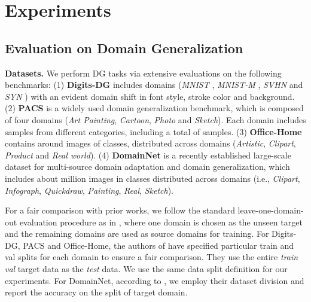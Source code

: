 \documentclass[10pt,twocolumn,letterpaper]{article}
\newcommand{\0}{{\bf 0}}
\begin{document}
\section{Experiments}

\subsection{Evaluation on Domain Generalization}
\textbf{Datasets.} We perform DG tasks via extensive evaluations on the following benchmarks: (1) \textbf{Digits-DG} \cite{zhou2020learning} includes  domains (\textit{MNIST} \cite{lecun1998gradient}, \textit{MNIST-M} \cite{ganin2015unsupervised}, \textit{SVHN} \cite{netzer2011reading} and \textit{SYN} \cite{ganin2015unsupervised}) with an evident domain shift in font style, stroke color and background. (2) \textbf{PACS} \cite{li2017deeper} is a widely used domain generalization benchmark, which is composed of four domains (\textit{Art Painting}, \textit{Cartoon}, \textit{Photo} and \textit{Sketch}). Each domain includes samples from  different categories, including a total of  samples. (3) \textbf{Office-Home} \cite{venkateswara2017deep} contains around  images of  classes, distributed across  domains (\textit{Artistic}, \textit{Clipart}, \textit{Product} and \textit{Real world}). (4) \textbf{DomainNet} \cite{peng2019moment} is a recently established large-scale dataset for multi-source domain adaptation and domain generalization, which includes about  million images in  classes distributed across  domains (i.e., \textit{Clipart}, \textit{Infograph}, \textit{Quickdraw}, \textit{Painting}, \textit{Real}, \textit{Sketch}).

For a fair comparison with prior works, we follow the standard leave-one-domain-out evaluation procedure as in \cite{carlucci2019domain, li2017deeper, li2019episodic}, where one domain is chosen as the unseen target and the remaining domains are used as source domains for training. For Digits-DG, PACS and Office-Home, the authors of \cite{zhou2020learning, zhou2020domain, zhou2021domain} have specified particular train and val splits for each domain to ensure a fair comparison. They use the entire \textit{train}  \textit{val} target data as the \textit{test} data. We use the same data split definition for our experiments. For DomainNet, according to \cite{chattopadhyay2020learning}, we employ their dataset division and report the accuracy on the  split of target domain.
\end{document}
